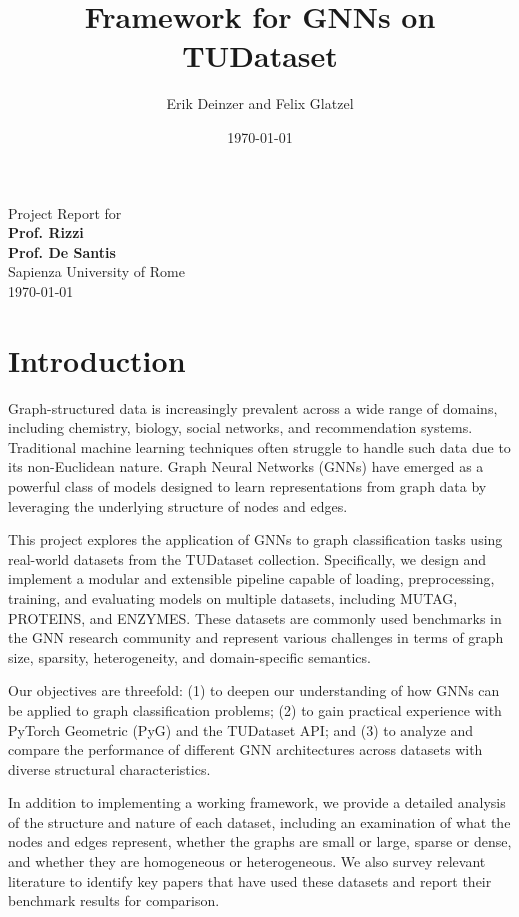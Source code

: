 \documentclass[11pt,a4paper]{article}
\title{Framework for GNNs on TUDataset}
\author{Erik Deinzer and Felix Glatzel}
\date{\today}
\begin{document}
	
	\maketitle
	\thispagestyle{empty}
	\vfill
	\begin{center}
		\large
		Project Report for \\[0.5cm]
		\textbf{Prof. Rizzi} \\[0.5cm]
		\textbf{Prof. De Santis} \\[0.5cm]
		Sapienza University of Rome \\[0.5cm]
		\today
	\end{center}
	\vfill
	\newpage
	
	\tableofcontents
	\newpage
	
	\section{Introduction}
	Graph-structured data is increasingly prevalent across a wide range of domains, including chemistry, biology, social networks, and recommendation systems. Traditional machine learning techniques often struggle to handle such data due to its non-Euclidean nature. Graph Neural Networks (GNNs) have emerged as a powerful class of models designed to learn representations from graph data by leveraging the underlying structure of nodes and edges.
	
	This project explores the application of GNNs to graph classification tasks using real-world datasets from the TUDataset collection. Specifically, we design and implement a modular and extensible pipeline capable of loading, preprocessing, training, and evaluating models on multiple datasets, including MUTAG, PROTEINS, and ENZYMES. These datasets are commonly used benchmarks in the GNN research community and represent various challenges in terms of graph size, sparsity, heterogeneity, and domain-specific semantics.
	
	Our objectives are threefold: (1) to deepen our understanding of how GNNs can be applied to graph classification problems; (2) to gain practical experience with PyTorch Geometric (PyG) and the TUDataset API; and (3) to analyze and compare the performance of different GNN architectures across datasets with diverse structural characteristics.
	
	In addition to implementing a working framework, we provide a detailed analysis of the structure and nature of each dataset, including an examination of what the nodes and edges represent, whether the graphs are small or large, sparse or dense, and whether they are homogeneous or heterogeneous. We also survey relevant literature to identify key papers that have used these datasets and report their benchmark results for comparison.
	
\end{document}

